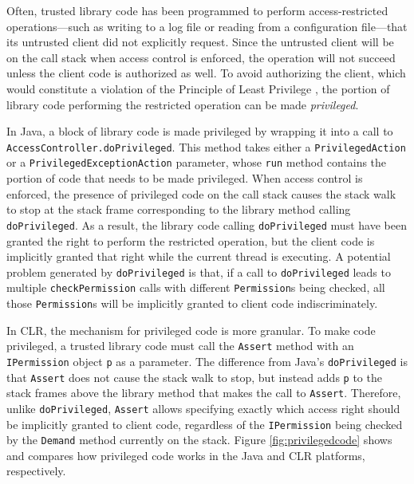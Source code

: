 Often, trusted library code has been programmed to perform
access-restricted operations---such as writing to a log file or
reading from a configuration file---that its untrusted client did
not explicitly request. Since the untrusted client will be on the
call stack when access control is enforced, the operation will not
succeed unless the client code is authorized as well.  To avoid
authorizing the client, which would constitute a violation of the
Principle of Least Privilege \cite{paper:PrincLeastPriv}, the
portion of library code performing the restricted operation can be
made \emph{privileged}.

In Java, a block of library code is made privileged by wrapping
it into a call to \texttt{AccessController.doPrivileged}. This
method takes either a \texttt{PrivilegedAction} or a
\texttt{PrivilegedExceptionAction} parameter, whose \texttt{run}
method contains the portion of code that needs to be made
privileged.  When access control is enforced, the presence of
privileged code on the call stack causes the stack walk to stop at
the stack frame corresponding to the library method calling
\texttt{doPrivileged}. As a result, the library code calling
\texttt{doPrivileged} must have been granted the right to perform
the restricted operation, but the client code is implicitly
granted that right while the current thread is executing.  A
potential problem generated by \texttt{doPrivileged} is that, if a
call to \texttt{doPrivileged} leads to multiple
\texttt{checkPermission} calls with different \texttt{Permission}s
being checked, all those \texttt{Permission}s will be implicitly
granted to client code indiscriminately.

In CLR, the mechanism for privileged code is more granular.  To
make code privileged, a trusted library code must call the
\texttt{Assert} method with an \texttt{IPermission} object
\texttt{p} as a parameter. The difference from Java's
\texttt{doPrivileged} is that \texttt{Assert} does not cause the
stack walk to stop, but instead adds \texttt{p} to the stack
frames above the library method that makes the call to
\texttt{Assert}.  Therefore, unlike \texttt{doPrivileged},
\texttt{Assert} allows specifying exactly which access right
should be implicitly granted to client code, regardless of the
\texttt{IPermission} being checked by the \texttt{Demand} method
currently on the stack.  Figure \ref{fig:privilegedcode} shows and
compares how privileged code works in the Java and CLR
platforms, respectively.

